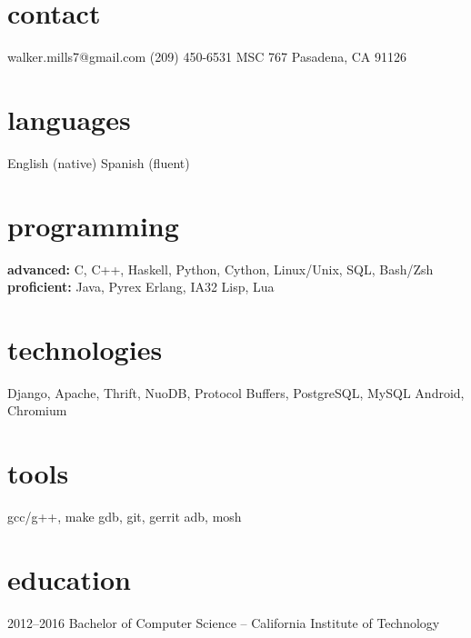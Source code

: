\documentclass[]{mills-cv} %
\begin{document}


\begin{aside} %
\section{contact}
\small walker.mills7@gmail.com
(209) 450-6531
MSC 767
Pasadena, CA 91126
\section{languages}
English (native)
Spanish (fluent)
\section{programming}
\textbf{advanced:}
C, C++, Haskell,
Python, Cython, 
Linux/Unix, SQL,
Bash/Zsh
\textbf{proficient:}
Java, Pyrex
Erlang, IA32
Lisp, Lua
\section{technologies}
Django, Apache,
Thrift, NuoDB,
Protocol Buffers,
PostgreSQL, MySQL
Android, Chromium
\section{tools}
gcc/g++, make
gdb, git, gerrit
adb, mosh
\end{aside}


\section{education}

\begin{entrylist}
\entry
{2012--2016}
{Bachelor of Computer Science \normalfont -- California Institute of Technology}{}{}
\end{entrylist}
\end{document}
